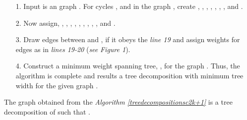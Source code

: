 \documentclass[runningheads]{llncs}
\begin{document}
\begin{itemize}
\item[1.] Input is an  graph . For cycles ,  and  in the graph , create , , , , , , ,  and .
\item[2.] Now assign, , , , , , , , , ,  and .
\item[3.] Draw edges between  and ,  if it obeys the \emph{line 19} and assign weights for edges as in \emph{lines 19-20} (\emph{see} \emph{Figure 1}).
\item[4.] Construct a minimum weight spanning tree, , for the graph . Thus, the algorithm is complete and results a tree decomposition with minimum tree width for the given graph .
\end{itemize}

\begin{theorem}\label{prooftreedecomp2k+1}
The graph  obtained from the \emph{Algorithm \ref{treedecompositionsc2k+1}} is a tree decomposition of  such that .
\end{theorem}
\end{document}
